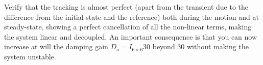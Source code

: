 \documentclass[11pt]{article}
\begin{document}
Verify that the tracking is almost perfect (apart from the transient due to the difference from the initial state and the reference) both during the motion and at steady-state, showing a perfect cancellation of all the non-linear terms, making the system linear and decoupled. 
An important consequence is that you can now increase at will the damping gain  $D_o = I_{6\times6}30$ beyond 30 without making the system unstable.

 
\end{document}
